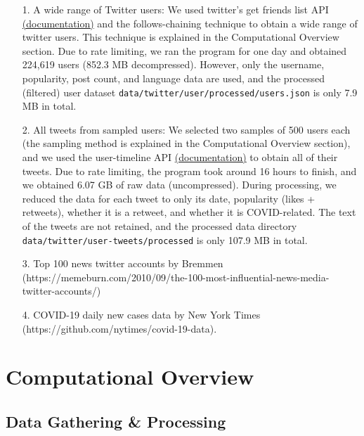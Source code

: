 \documentclass{article}
\newcommand{\C}{\texttt}
\begin{document}
    \begin{itemize}
        \item[1.] A wide range of Twitter users: We used twitter's get friends list API \href{https://developer.twitter.com/en/docs/twitter-api/v1/accounts-and-users/follow-search-get-users/api-reference/get-friends-list}{(documentation)} and the follows-chaining technique to obtain a wide range of twitter users. This technique is explained in the Computational Overview section. Due to rate limiting, we ran the program for one day and obtained 224,619 users (852.3 MB decompressed). However, only the username, popularity, post count, and language data are used, and the processed (filtered) user dataset \C{data/twitter/user/processed/users.json} is only 7.9 MB in total.
         
        \item[2.] All tweets from sampled users: We selected two samples of 500 users each (the sampling method is explained in the Computational Overview section), and we used the user-timeline API \href{https://developer.twitter.com/en/docs/twitter-api/v1/tweets/timelines/api-reference/get-statuses-user_timeline}{(documentation)} to obtain all of their tweets. Due to rate limiting, the program took around 16 hours to finish, and we obtained 6.07 GB of raw data (uncompressed). During processing, we reduced the data for each tweet to only its date, popularity (likes + retweets), whether it is a retweet, and whether it is COVID-related. The text of the tweets are not retained, and the processed data directory \C{data/twitter/user-tweets/processed} is only 107.9 MB in total.
        
        \item[3.] Top 100 news twitter accounts by Bremmen (https://memeburn.com/2010/09/the-100-most-influential-news-media-twitter-accounts/)
        \item[4.] COVID-19 daily new cases data by New York Times (https://github.com/nytimes/covid-19-data). 
    \end{itemize}
 
    \section{Computational Overview}

    \subsection*{Data Gathering \& Processing}
    \indent
\end{document}
